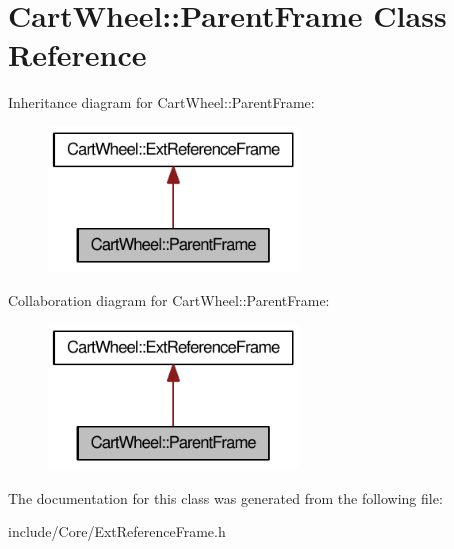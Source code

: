 \hypertarget{classCartWheel_1_1ParentFrame}{
\section{CartWheel::ParentFrame Class Reference}
\label{classCartWheel_1_1ParentFrame}
}


Inheritance diagram for CartWheel::ParentFrame:\nopagebreak
\begin{figure}[H]
\begin{center}
\leavevmode
\includegraphics[width=188pt]{classCartWheel_1_1ParentFrame__inherit__graph}
\end{center}
\end{figure}


Collaboration diagram for CartWheel::ParentFrame:\nopagebreak
\begin{figure}[H]
\begin{center}
\leavevmode
\includegraphics[width=188pt]{classCartWheel_1_1ParentFrame__coll__graph}
\end{center}
\end{figure}


The documentation for this class was generated from the following file:\begin{DoxyCompactItemize}
\item 
include/Core/ExtReferenceFrame.h\end{DoxyCompactItemize}
